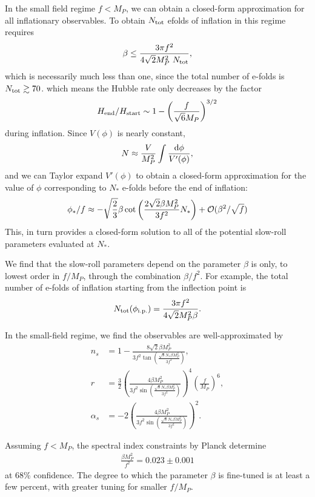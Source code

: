 \documentclass[aps,amsfonts,amsmath,prd,preprint,nofootinbib]{revtex4}
\newcommand{\Mp}{{M_{P}}}
\newcommand{\MMp}{{M_P^2}}
\newcommand{\rmd}{{\rm d}}
\begin{document}
In the small field regime  $f < \Mp$, we can obtain a closed-form approximation for all inflationary observables.  To obtain $N_{\rm tot}$ efolds of inflation in this regime requires
\begin{align}
 \beta \leq \frac{3\pi f^2}{4\sqrt{2}\MMp~N_{\rm tot}}, 
 \end{align}
which is necessarily much less than one, since the total number of e-folds is $N_{\rm tot} \gtrsim 70$. 
which means the Hubble rate only decreases by the factor
\begin{align}
H_{\rm end}/H_{\rm start} \sim 1-\left(\frac{f}{\sqrt{6}\Mp}\right)^{3/2}
\end{align}
during inflation.  
Since $V(\phi)$ is nearly constant, 
\begin{align}
N \approx \frac{V}{\MMp}\int\frac{\rmd\phi}{V'(\phi)},
\end{align}
and we can Taylor expand $V'(\phi)$ to obtain a closed-form approximation for the value of $\phi$ corresponding to $N_\ast$ e-folds before the end of inflation:
\begin{align}
\phi_\ast/f \approx -\sqrt{\frac{2}{3}}\beta \cot\left(\frac{2\sqrt{2}\beta\MMp}{3f^2}N_\ast\right) + {\cal O}(\beta^2/\sqrt{f})
\end{align}  
This, in turn provides a closed-form solution to all of the potential slow-roll parameters
evaluated at $N_\ast$.

We find that the slow-roll parameters depend
on the parameter $\beta$ is only, to lowest order in $f/\Mp$, through the combination $\beta/f^2$.  For example, the total number of e-folds of inflation starting from the inflection point is
\begin{align}
N_{\rm tot}(\phi_{\rm i.p.}) = \frac{3 \pi f^2}{4\sqrt{2}\MMp\beta}.
\end{align}

In the small-field regime, we find the observables are well-approximated by
\begin{align}
n_s &= 1- \frac{8\sqrt{2}\beta \MMp}{3f^2\tan(\frac{\sqrt{8}N_\ast\beta\MMp}{3 f^2})},\label{eq:nsSF}\\
r &= \frac{3}{2}\left(\frac{4\beta\MMp}{3f^2\sin(\frac{\sqrt{8}N_\ast\beta\MMp}{3 f^2})}\right)^4 \left(\frac{f}{\Mp}\right)^6 ,\\
\alpha_s &= -2\left(\frac{4\beta \MMp}{3f^2\sin(\frac{\sqrt{8}N_\ast\beta\MMp}{3 f^2})} \right)^2.
\end{align}

Assuming $f < \Mp$, the spectral index constraints by Planck \cite{Akrami:2018odb} determine
\begin{align}
\frac{\beta \MMp}{f^2} = 0.023 \pm 0.001
\end{align}
 at 68\% confidence.  The degree to which the parameter $\beta$ is fine-tuned is at least a few percent, with greater tuning for smaller $f/\Mp$.
\end{document}
